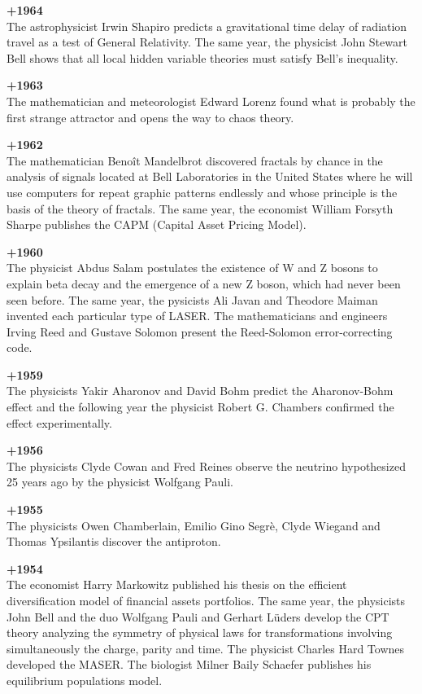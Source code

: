 \textbf{+1964}\\
The astrophysicist Irwin Shapiro predicts a gravitational time delay of radiation travel as a test of General Relativity. The same year, the physicist John Stewart Bell shows that all local hidden variable theories must satisfy Bell's inequality.

\textbf{+1963}\\
The mathematician and meteorologist Edward Lorenz found what is probably the first strange attractor and opens the way to chaos theory.

\textbf{+1962}\\
The mathematician Benoît Mandelbrot discovered fractals by chance in the analysis of signals located at Bell Laboratories in the United States where he will use computers for repeat graphic patterns endlessly and whose principle is the basis of the theory of fractals. The same year, the economist William Forsyth Sharpe publishes the CAPM (Capital Asset Pricing Model). 

\textbf{+1960}\\
The physicist Abdus Salam postulates the existence of W and Z bosons to explain beta decay and the emergence of a new Z boson, which had never been seen before. The same year, the pysicists Ali Javan and Theodore Maiman invented each particular type of LASER. The mathematicians and engineers Irving Reed and Gustave Solomon present the Reed-Solomon error-correcting code.

\textbf{+1959}\\
The physicists Yakir Aharonov and David Bohm predict the Aharonov-Bohm effect and the following year the physicist Robert G. Chambers confirmed the effect experimentally. 

\textbf{+1956}\\
The physicists Clyde Cowan and Fred Reines observe the neutrino hypothesized 25 years ago by the physicist Wolfgang Pauli.

\textbf{+1955}\\
The physicists Owen Chamberlain, Emilio Gino Segrè, Clyde Wiegand and Thomas Ypsilantis discover the antiproton.

\textbf{+1954}\\
The economist Harry Markowitz published his thesis on the efficient diversification model of financial assets portfolios. The same year, the physicists John Bell and the duo Wolfgang Pauli and Gerhart Lüders develop the CPT theory analyzing the symmetry of physical laws for transformations involving simultaneously the charge, parity and time. The physicist Charles Hard Townes developed the MASER. The biologist Milner Baily Schaefer publishes his equilibrium populations model.

